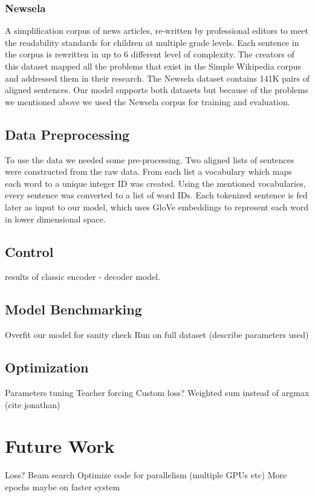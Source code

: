 \documentclass{article}
\begin{document}
\subsubsection{Newsela \cite{Xu-EtAl:2015:TACL}}
A simplification corpus of news articles, re-written by professional editors to meet the readability standards for children at multiple grade levels. Each sentence in the corpus is rewritten in up to 6 different level of complexity. The creators of this dataset mapped all the problems that exist in the Simple Wikipedia corpus and addressed them in their research. The Newsela dataset contains 141K pairs of aligned sentences.
Our model supports both datasets but because of the problems we mentioned above we used the Newsela corpus for training and evaluation.


\subsection{Data Preprocessing}
To use the data we needed some pre-processing. Two aligned lists of sentences were constructed from the raw data. From each list a vocabulary which maps each word to a unique integer ID was created. Using the mentioned vocabularies, every sentence was converted to a list of word IDs. Each tokenized sentence is fed later as input to our model, which uses GloVe embeddings \cite{pennington2014glove} to represent each word in lower dimensional space.

\subsection{Control}
results of classic encoder - decoder model.

\subsection{Model Benchmarking}
Overfit our model for sanity check
Run on full dataset (describe parameters used)

\subsection{Optimization}
	Parameters tuning \cite{neishi2017bag}
	Teacher forcing
	Custom loss?
	Weighted sum instead of argmax (cite jonathan)

\section{Future Work}
	Loss?
	Beam search
	Optimize code for parallelism (multiple GPUs etc)
	More epochs maybe on faster system
\end{document}
